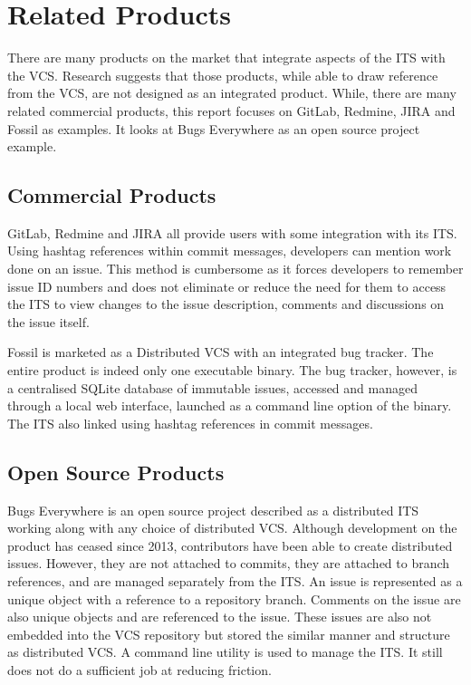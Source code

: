 \documentclass{mproj}
\begin{document}
\section{Related Products}

There are many products on the market that integrate aspects of the ITS with the VCS. Research suggests that those products, while able to draw reference from the VCS, are not designed as an integrated product. While, there are many related commercial products, this report focuses on GitLab, Redmine, JIRA and Fossil as examples. It looks at Bugs Everywhere as an open source project example.

\subsection{Commercial Products}

GitLab, Redmine and JIRA all provide users with some integration with its ITS. Using hashtag references within commit messages, developers can mention work done on an issue. This method is cumbersome as it forces developers to remember issue ID numbers and does not eliminate or reduce the need for them to access the ITS to view changes to the issue description, comments and discussions on the issue itself.

Fossil is marketed as a Distributed VCS with an integrated bug tracker. The entire product is indeed only one executable binary. The bug tracker, however, is a centralised SQLite database of immutable issues, accessed and managed through a local web interface, launched as a command line option of the binary. The ITS also linked using hashtag references in commit messages.

\subsection{Open Source Products}

Bugs Everywhere is an open source project described as a distributed ITS working along with any choice of distributed VCS. Although development on the product has ceased since 2013, contributors have been able to create distributed issues. However, they are not attached to commits, they are attached to branch references, and are managed separately from the ITS. An issue is represented as a unique object with a reference to a repository branch. Comments on the issue are also unique objects and are referenced to the issue. These issues are also not embedded into the VCS repository but stored the similar manner and structure as distributed VCS. A command line utility is used to manage the ITS. It still does not do a sufficient job at reducing friction.
\end{document}
